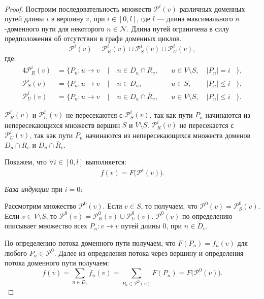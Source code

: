 \documentclass[../thesis.tex]{subfiles}
\begin{document}
\begin{proof}
Построим последовательность множеств $\mathcal{P}^i(v)$ различных доменных путей длины $i$ в вершину $v$, при $i \in [0,l]$, где $l$ --- длина максимального $n$-доменного пути для некоторого $n \in\mathcal{N}$.
Длина путей ограничена в силу предположения об отсутствии в графе доменных циклов.
\begin{equation}
    \mathcal{P}^i(v) = \mathcal{P}^i_R(v) \cup \mathcal{P}^i_S(v) \cup \mathcal{P}^i_U(v),
\end{equation}
где:
\begin{alignat}{4}
    \mathcal{P}^i_R(v) &= \{ P_n:u\rightarrow v \;&|&\; n\in D_u\cap R_v,           ~&&u\in V\setminus S, ~&|P_n| = i   &\}, \\
    \mathcal{P}^i_S(v) &= \{ P_n:u\rightarrow v \;&|&\; n\in D_u,                   ~&&u\in S,            ~&|P_n|\leqslant i &\}, \\
    \mathcal{P}^i_U(v) &= \{ P_n:u\rightarrow v \;&|&\; n\in D_u\cap\overline{R}_v, ~&&u\in V\setminus S, ~&|P_n|\leqslant i &\}.
\end{alignat}

$\mathcal{P}^i_R(v)$ и $\mathcal{P}^i_U(v)$ не пересекаются с $\mathcal{P}^i_S(v)$, так как пути $P_n$ начинаются из непересекающихся множеств вершин $S$ и $V\setminus S$.
$\mathcal{P}^i_R(v)$ не пересекается с $\mathcal{P}^i_U(v)$, так как пути $P_n$ начинаются из непересекающихся множеств доменов $D_u\cap R_v$ и $D_u\cap\overline{R}_v$.

Покажем, что $\forall i\in[0,l]$ выполняется:
\begin{equation} \label{eq:f_P_v_1}
    f(v) = F\big(\mathcal{P}^i(v)\big).
\end{equation}

\textit{База индукции} при $i=0$:  

Рассмотрим множество $\mathcal{P}^0(v)$.
Если $v\in S$, то получаем, что $\mathcal{P}^0(v) = \mathcal{P}^0_S(v)$.
Если $v\in V\setminus S$, то $\mathcal{P}^0(v) = \mathcal{P}^0_R(v) \cup \mathcal{P}^0_U(v)$.
$\mathcal{P}^0(v)$ по определению описывает множество всех $P_n:v\rightarrow v$ путей длины 0, при $n\in D_v$.

По определению потока доменного пути получаем, что $F(P_n) = f_n(v)$ для любого $P_n\in \mathcal{P}^0$.
Далее из определения потока через вершину и определения потока доменного пути получаем:
\begin{equation}
    f(v) = \sum_{n\in D_v}{f_n(v)} = \sum_{P_n\in \mathcal{P}^0(v)}{F(P_n)} = F\big(\mathcal{P}^0(v)\big).
\end{equation}


\end{proof}
\end{document}
